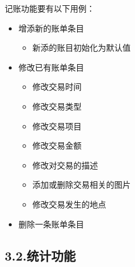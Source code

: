 \documentclass{article}
\begin{document}
\noindent{}记账功能要有以下用例：%

\begin{itemize}[noitemsep,topsep=\mdcompacttopsep]%

\item{}增添新的账单条目

\begin{itemize}[noitemsep,topsep=\mdcompacttopsep]%

\item{}新添的账目初始化为默认值%
\end{itemize}%

\item{}修改已有账单条目

\begin{itemize}[noitemsep,topsep=\mdcompacttopsep]%

\item{}修改交易时间%

\item{}修改交易类型%

\item{}修改交易项目%

\item{}修改交易金额%

\item{}修改对交易的描述%

\item{}添加或删除交易相关的图片%

\item{}修改交易发生的地点%
\end{itemize}%

\item{}删除一条账单条目%
\end{itemize}%

\subsection{3.2.\hspace*{0.5em}统计功能}\label{section}%
\end{document}
